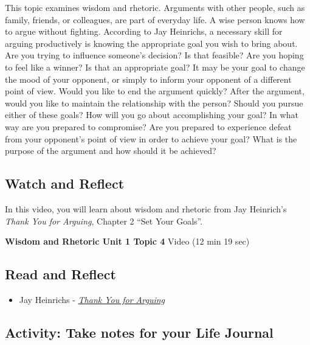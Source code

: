 \documentclass[
]{book}
\providecommand{\tightlist}{%
  \setlength{\itemsep}{0pt}\setlength{\parskip}{0pt}}
\begin{document}
This topic examines wisdom and rhetoric. Arguments with other people, such as family, friends, or colleagues, are part of everyday life. A wise person knows how to argue without fighting. According to Jay Heinrichs, a necessary skill for arguing productively is knowing the appropriate goal you wish to bring about. Are you trying to influence someone's decision? Is that feasible? Are you hoping to feel like a winner? Is that an appropriate goal? It may be your goal to change the mood of your opponent, or simply to inform your opponent of a different point of view. Would you like to end the argument quickly? After the argument, would you like to maintain the relationship with the person? Should you pursue either of these goals? How will you go about accomplishing your goal? In what way are you prepared to compromise? Are you prepared to experience defeat from your opponent's point of view in order to achieve your goal? What is the purpose of the argument and how should it be achieved?

\hypertarget{watch-and-reflect-7}{%
\subsection*{Watch and Reflect}\label{watch-and-reflect-7}}

In this video, you will learn about wisdom and rhetoric from Jay Heinrich's \emph{Thank You for Arguing}, Chapter 2 ``Set Your Goals''.

\textbf{Wisdom and Rhetoric Unit 1 Topic 4} Video (12 min 19 sec)

\hypertarget{read-and-reflect-3}{%
\subsection*{Read and Reflect}\label{read-and-reflect-3}}

\begin{itemize}
\tightlist
\item
  Jay Heinrichs - \href{assets/u1/PHIL-100-Heinrichs-Thank-You-for-Arguing.pdf}{\emph{Thank You for Arguing}}
\end{itemize}

\hypertarget{activity-take-notes-for-your-life-journal-1}{%
\subsection*{Activity: Take notes for your Life Journal}\label{activity-take-notes-for-your-life-journal-1}}
\end{document}
